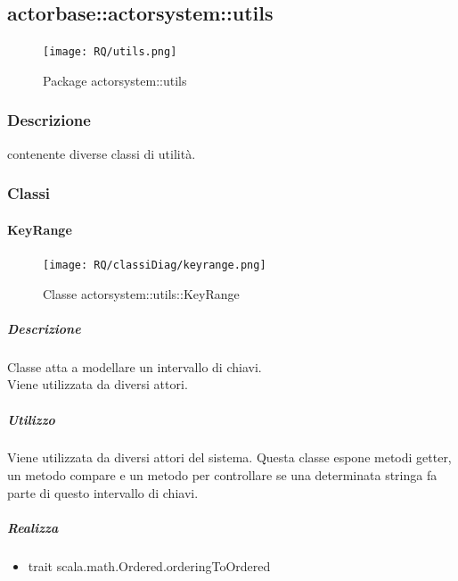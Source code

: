 \documentclass{scalatekids-article}
\begin{document}
\subsection{actorbase::actorsystem::utils}
\label{sec:actorbase::actorsystem::utils}

\begin{figure}[H]
  \begin{center}
    \texttt{[image: RQ/utils.png]}
    \caption{Package actorsystem::utils}
  \end{center}
\end{figure}

\subsubsection{Descrizione}
 contenente diverse classi di utilità.

\subsubsection{Classi}


\paragraph{KeyRange}
\label{sec:actorbase::actorsystem::utils::KeyRange}

\begin{figure}[H]
  \begin{center}
    \texttt{[image: RQ/classiDiag/keyrange.png]}
    \caption{Classe actorsystem::utils::KeyRange}
  \end{center}
\end{figure}

\subparagraph{Descrizione}
Classe atta a modellare un intervallo di chiavi.\\Viene utilizzata da diversi
attori.

\subparagraph{Utilizzo}
Viene utilizzata da diversi attori del sistema. Questa classe espone metodi
getter, un metodo compare e un metodo per controllare se una determinata
stringa fa parte di questo intervallo di chiavi.

\subparagraph{Realizza}
\begin{itemize}
\item trait scala.math.Ordered.orderingToOrdered
\end{itemize}
\end{document}

